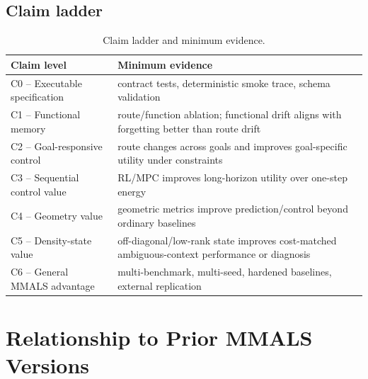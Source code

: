 \documentclass[10pt]{article}
\begin{document}
\subsection{Claim ladder}

\begin{table}[h]
\centering
\caption{Claim ladder and minimum evidence.}
\label{tab:claims}
\begin{tabularx}{\textwidth}{lX}
\toprule
Claim level & Minimum evidence \\
\midrule
C0 -- Executable specification & contract tests, deterministic smoke trace, schema validation \\
C1 -- Functional memory & route/function ablation; functional drift aligns with forgetting better than route drift \\
C2 -- Goal-responsive control & route changes across goals and improves goal-specific utility under constraints \\
C3 -- Sequential control value & RL/MPC improves long-horizon utility over one-step energy \\
C4 -- Geometry value & geometric metrics improve prediction/control beyond ordinary baselines \\
C5 -- Density-state value & off-diagonal/low-rank state improves cost-matched ambiguous-context performance or diagnosis \\
C6 -- General MMALS advantage & multi-benchmark, multi-seed, hardened baselines, external replication \\
\bottomrule
\end{tabularx}
\end{table}

\section{Relationship to Prior MMALS Versions}
\end{document}
